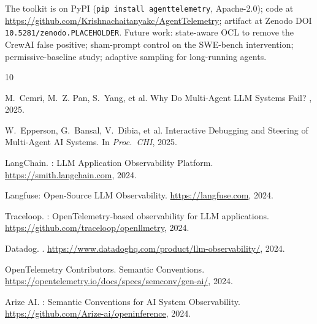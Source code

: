 \documentclass[sigconf,review]{acmart}
\begin{document}
The toolkit is on PyPI (\texttt{pip install agenttelemetry},
Apache-2.0); code at
\url{https://github.com/Krishnachaitanyakc/AgentTelemetry}; artifact
at Zenodo DOI \texttt{10.5281/zenodo.PLACEHOLDER}.  Future work:
state-aware OCL to remove the CrewAI false positive; sham-prompt
control on the SWE-bench intervention; permissive-baseline study;
adaptive sampling for long-running agents.

\begin{thebibliography}{10}

M.~Cemri, M.~Z. Pan, S.~Yang, et al.
\newblock Why Do Multi-Agent {LLM} Systems Fail?
, 2025.

W.~Epperson, G.~Bansal, V.~Dibia, et al.
\newblock Interactive Debugging and Steering of Multi-Agent {AI}
Systems.
\newblock In {\em Proc.\ CHI}, 2025.

LangChain.
: LLM Application Observability Platform.
\newblock \url{https://smith.langchain.com}, 2024.

{Langfuse}: Open-Source {LLM} Observability.
\newblock \url{https://langfuse.com}, 2024.

Traceloop.
: OpenTelemetry-based observability for {LLM}
applications.
\newblock \url{https://github.com/traceloop/openllmetry}, 2024.

Datadog.
.
\newblock \url{https://www.datadoghq.com/product/llm-observability/}, 2024.

{OpenTelemetry Contributors}.
 Semantic Conventions.
\newblock \url{https://opentelemetry.io/docs/specs/semconv/gen-ai/}, 2024.

{Arize AI}.
: Semantic Conventions for {AI} System
Observability.
\newblock \url{https://github.com/Arize-ai/openinference}, 2024.

\end{thebibliography}
\end{document}
